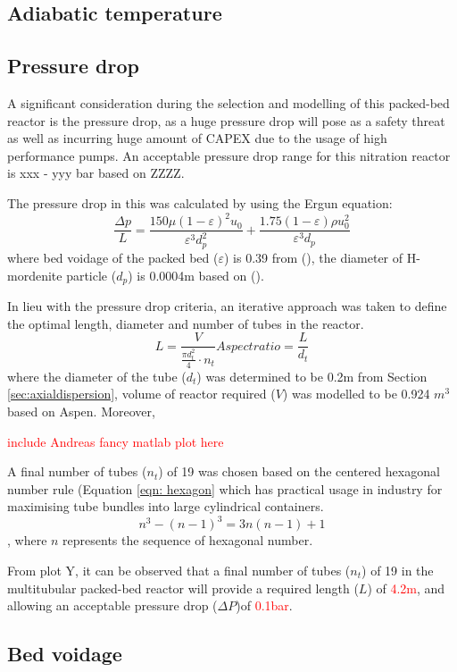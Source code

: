 \subsection{Adiabatic temperature}
\subsection{Pressure drop}

A significant consideration during the selection and modelling of this packed-bed reactor is the pressure drop, as a huge pressure drop will pose as a safety threat as well as incurring huge amount of CAPEX due to the usage of high performance pumps. An acceptable pressure drop range for this nitration reactor is xxx - yyy bar based on ZZZZ. 

The pressure drop in this was calculated by using the Ergun equation: 
\begin{equation}
    \frac{\Delta p}{L} = \frac{150 \mu (1- \varepsilon)^2 u_0}{\varepsilon^3 d_p^2} + \frac{1.75(1-\varepsilon)\rho u_0^2}{\varepsilon^3 d_p}
    \label{eqn:ergun}
\end{equation}
where bed voidage of the packed bed ($\varepsilon$) is 0.39 from (), the diameter of H-mordenite particle ($d_p$) is 0.0004m based on (). 

In lieu with the pressure drop criteria, an iterative approach was taken to define the optimal length, diameter and number of tubes in the reactor. 
\begin{equation}
    L= \frac{V}{\frac{\pi d_t^2}{4}\cdot n_t}
    Aspect ratio = \frac{L}{d_t}
    \label{eqn:pressuredrop}
\end{equation}
where the diameter of the tube ($d_t$) was determined to be 0.2m from Section \ref{sec:axialdispersion}, volume of reactor required ($V$) was modelled to be 0.924 $m^3$ based on Aspen. Moreover, 

\textcolor{red}{include Andreas fancy matlab plot here}

A final number of tubes ($n_t$) of 19 was chosen based on the centered hexagonal number rule (Equation \ref{eqn: hexagon} which has practical usage in industry for maximising tube bundles into large cylindrical containers. 
\begin{equation}
    n^3 - (n-1)^3 = 3n(n-1)+1
    \label{eqn: hexagon}
\end{equation},
where $n$ represents the sequence of hexagonal number. 

From plot Y, it can be observed that a final number of tubes ($n_t$) of 19 in the multitubular packed-bed reactor will provide a required length ($L$) of \textcolor{red}{4.2m}, and allowing an acceptable pressure drop ($\Delta P$)of \textcolor{red}{0.1bar}.  

\subsection{Bed voidage}
